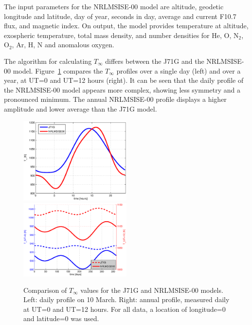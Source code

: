 \documentclass[a4paper]{article}
\begin{document}
The input parameters for the NRLMSISE-00 model are altitude, geodetic longitude and latitude, day of year, seconds in day, average and current F10.7 flux, and magnetic index. On output, the model provides temperature at altitude, exospheric temperature, total mass density, and number densities for He, O, N$_2$, O$_2$, Ar, H, N and anomalous oxygen.

The algorithm for calculating $T_\infty$ differs between the J71G and the NRLMSISE-00 model. Figure~\ref{fig:comp_tinfty} compares the $T_\infty$ profiles over a single day (left) and over a year, at UT=0 and UT=12 hours (right). It can be seen that the daily profile of the NRLMSISE-00 model appears more complex, showing less symmetry and a pronounced minimum. The annual NRLMSISE-00 profile displays a higher amplitude and lower average than the J71G model.

\begin{figure}
\includegraphics[width=0.5\textwidth]{tinf_daily.eps}
\includegraphics[width=0.5\textwidth]{tinf_annual.eps}
\caption{Comparison of $T_\infty$ values for the J71G and NRLMSISE-00 models. Left: daily profile on 10 March. Right: annual profile, measured daily at UT=0 and UT=12 hours. For all data, a location of longitude=0 and latitude=0 was used.}
\label{fig:comp_tinfty}
\end{figure}
\end{document}
